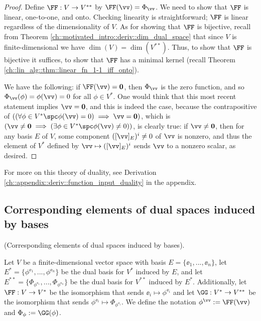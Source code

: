 \begin{proof}
    Define $\FF:V \rightarrow V^{**}$ by $\FF(\vv) = \Phi_\vv$. We need to show that $\FF$ is linear, one-to-one, and onto. Checking linearity is straightforward; $\FF$ is linear regardless of the dimensionality of $V$. As for showing that $\FF$ is bijective, recall from Theorem \ref{ch::motivated_intro::deriv::dim_dual_space} that since $V$ is finite-dimensional we have $\dim(V) = \dim(V^{**})$. Thus, to show that $\FF$ is bijective it suffices, to show that $\FF$ has a minimal kernel (recall Theorem \ref{ch::lin_alg::thm::linear_fn_1-1_iff_onto}).
    
    We have the following: if $\FF(\vv) = \mathbf{0}$, then $\Phi_\vv$ is the zero function, and so $\Phi_\vv(\phi) = \phi(\vv) = 0$ for all $\phi \in V^*$. One would think that this most recent statement implies $\vv = \mathbf{0}$, and this is indeed the case, because the contrapositive of $((\forall \phi \in V^* \spc \phi(\vv) = 0) \implies \vv = \mathbf{0})$, which is $(\vv \neq \mathbf{0} \implies (\exists \phi \in V^* \spc \phi(\vv) \neq 0))$, is clearly true: if $\vv \neq \mathbf{0}$, then for any basis $E$ of $V$, some component $([\vv]_E)^i \neq 0$ of $\vv$ is nonzero, and thus the element of $V^*$ defined by $\vv \mapsto ([\vv]_E)^i$ sends $\vv$ to a nonzero scalar, as desired.
\end{proof}

For more on this theory of duality, see Derivation \ref{ch::appendix::deriv::function_input_duality} in the appendix.

\newpage

\subsection*{Corresponding elements of dual spaces induced by bases}

\begin{defn}
    (Corresponding elements of dual spaces induced by bases).
    
    Let $V$ be a finite-dimensional vector space with basis $E = \{\ee_1, ..., \ee_n\}$, let $E^* = \{\phi^{\ee_1}, ..., \phi^{\ee_n}\}$ be the dual basis for $V^*$ induced by $E$, and let $E^{**} = \{\Phi_{\phi^{\ee_1}}, ..., \Phi_{\phi^{\ee_n}}\}$ be the dual basis for $V^{**}$ induced by $E^*$. Additionally, let $\FF:V \rightarrow V^*$ be the isomorphism that sends $\ee_i \mapsto \phi^{\ee_i}$ and let $\GG:V^* \rightarrow V^{**}$ be the isomorphism that sends $\phi^{\ee_i} \mapsto \Phi_{\phi^{\ee_i}}$. We define the notation $\phi^\vv := \FF(\vv)$ and $\Phi_\phi := \GG(\phi)$.
\end{defn}

